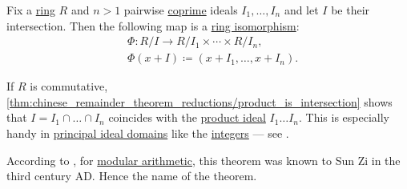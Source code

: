 \begin{theorem}\label{thm:chinese_remainder_theorem}
  Fix a \hyperref[def:ring]{ring} \( R \) and \( n > 1 \) pairwise \hyperref[def:semiring_ideal/coprime]{coprime} ideals \( I_1, \ldots, I_n \) and let \( I \) be their intersection. Then the following map is a \hyperref[def:ring/morphism]{ring isomorphism}:
  \begin{equation*}
    \begin{aligned}
      &\Phi: R / I \to R / I_1 \times \cdots \times R / I_n, \\
      &\Phi(x + I) \coloneqq (x + I_1, \ldots, x + I_n).
    \end{aligned}
  \end{equation*}
\end{theorem}
\begin{comments}
  \item If \( R \) is commutative, \cref{thm:chinese_remainder_theorem_reductions/product_is_intersection} shows that \( I = I_1 \cap \ldots \cap I_n \) coincides with the \hyperref[def:semiring_ideal/product]{product ideal} \( I_1 \ldots I_n \). This is especially handy in \hyperref[def:principal_ideal_domain]{principal ideal domains} like the \hyperref[def:integers]{integers} --- see .

  \item According to \textcite[\S 5.2]{Stillwell2010MathHistory}, for \hyperref[con:modular_arithmetic]{modular arithmetic}, this theorem was known to Sun Zi in the third century AD. Hence the name of the theorem.
\end{comments}
